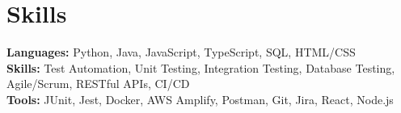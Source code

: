 \documentclass[11pt]{article}       %
\begin{document}

\vspace{-18.5pt}

\section*{Skills}
\textbf{Languages:} Python, Java, JavaScript, TypeScript, SQL, HTML/CSS\\
\textbf{Skills:} Test Automation, Unit Testing, Integration Testing, Database Testing, Agile/Scrum, RESTful APIs, CI/CD\\
\textbf{Tools:} JUnit, Jest, Docker, AWS Amplify, Postman, Git, Jira, React, Node.js\\

\vspace{-6.5pt}
\end{document}
